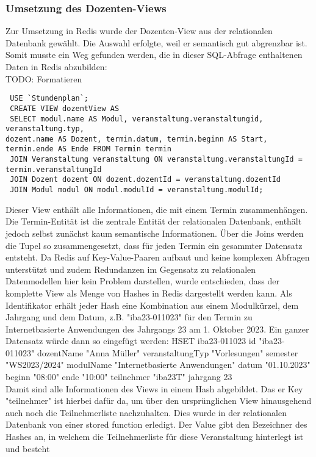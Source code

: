 \subsubsection{Umsetzung des Dozenten-Views}
Zur Umsetzung in Redis wurde der Dozenten-View aus der relationalen Datenbank gewählt. Die Auswahl erfolgte, weil er semantisch gut abgrenzbar ist.\\
Somit musste ein Weg gefunden werden, die in dieser SQL-Abfrage enthaltenen Daten in Redis abzubilden:\\
TODO: Formatieren\\
\begin{verbatim}
 USE `Stundenplan`;
 CREATE VIEW dozentView AS
 SELECT modul.name AS Modul, veranstaltung.veranstaltungid, veranstaltung.typ,
dozent.name AS Dozent, termin.datum, termin.beginn AS Start, termin.ende AS Ende FROM Termin termin
 JOIN Veranstaltung veranstaltung ON veranstaltung.veranstaltungId = termin.veranstaltungId
 JOIN Dozent dozent ON dozent.dozentId = veranstaltung.dozentId
 JOIN Modul modul ON modul.modulId = veranstaltung.modulId;
\end{verbatim}
Dieser View enthält alle Informationen, die mit einem Termin zusammenhängen. Die Termin-Entität ist die zentrale Entität der relationalen Datenbank, enthält jedoch
selbst zunächst kaum semantische Informationen. Über die Joins werden die Tupel so zusammengesetzt, dass für jeden Termin ein gesammter Datensatz entsteht.
\newline
Da Redis auf Key-Value-Paaren aufbaut und keine komplexen Abfragen unterstützt und zudem Redundanzen im Gegensatz zu relationalen Datenmodellen hier
kein Problem darstellen, wurde entschieden, dass der komplette View als Menge von Hashes in Redis dargestellt werden kann.
Als Identifikator erhält jeder Hash eine Kombination aus einem Modulkürzel, dem Jahrgang und dem Datum, z.B. "iba23-011023" für den Termin zu
Internetbasierte Anwendungen des Jahrgangs 23 am 1. Oktober 2023.
Ein ganzer Datensatz würde dann so eingefügt werden:
HSET iba23-011023 id "iba23-011023" dozentName "Anna Müller" veranstaltungTyp "Vorlesungen"
semester "WS2023/2024" modulName "Internetbasierte Anwendungen"
datum "01.10.2023" beginn "08:00" ende "10:00" teilnehmer "iba23T" jahrgang 23\\
Damit sind alle Informationen des Views in einem Hash abgebildet.
Das er Key "teilnehmer" ist hierbei dafür da, um über den ursprünglichen View hinausgehend auch noch die Teilnehmerliste nachzuhalten. Dies wurde in der relationalen
Datenbank von einer stored function erledigt. Der Value gibt den Bezeichner des Hashes an, in welchem die Teilnehmerliste für diese Veranstaltung hinterlegt ist und besteht
